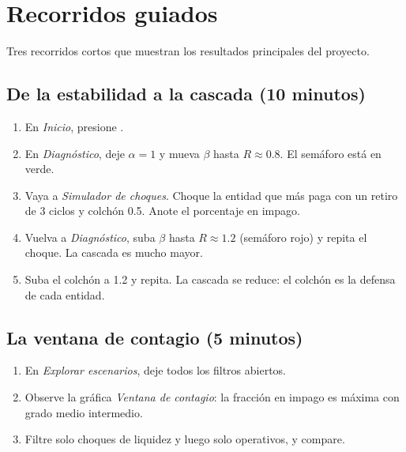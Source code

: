 \section{Recorridos guiados}

Tres recorridos cortos que muestran los resultados principales del proyecto.

\subsection{De la estabilidad a la cascada (10 minutos)}
\begin{enumerate}
\item En \emph{Inicio}, presione .
\item En \emph{Diagnóstico}, deje $\alpha=1$ y mueva $\beta$ hasta $R\approx0.8$. El
semáforo está en verde.
\item Vaya a \emph{Simulador de choques}. Choque la entidad que más paga con un retiro de
3 ciclos y colchón 0.5. Anote el porcentaje en impago.
\item Vuelva a \emph{Diagnóstico}, suba $\beta$ hasta $R\approx1.2$ (semáforo rojo) y repita
el choque. La cascada es mucho mayor.
\item Suba el colchón a 1.2 y repita. La cascada se reduce: el colchón es la defensa de
cada entidad.
\end{enumerate}

\subsection{La ventana de contagio (5 minutos)}
\begin{enumerate}
\item En \emph{Explorar escenarios}, deje todos los filtros abiertos.
\item Observe la gráfica \emph{Ventana de contagio}: la fracción en impago es máxima con
grado medio intermedio.
\item Filtre solo choques de liquidez y luego solo operativos, y compare.
\end{enumerate}

